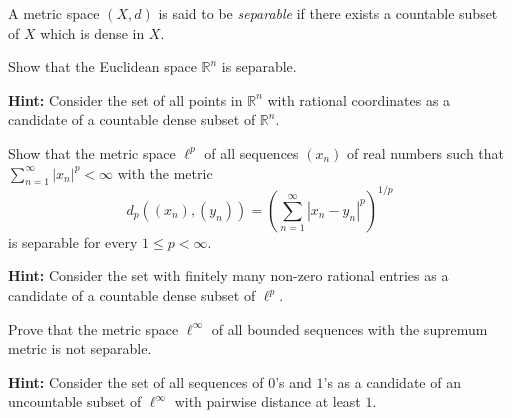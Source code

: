 \documentclass[12pt, a4paper]{article}
\begin{document}
\begin{definition}
A metric space $(X,d)$ is said to be \emph{separable} if there exists a countable subset of $X$
which is dense in $X$.
\end{definition}

\clearpage

\begin{problem}
Show that the Euclidean space $\mathbb{R}^n$ is separable.
\end{problem}
\textbf{Hint:} Consider the set of all points in $\mathbb{R}^n$ with rational coordinates as a candidate of a countable dense subset of $\mathbb{R}^n$.
\clearpage

\begin{problem}
Show that the metric space $\ell^p$ of all sequences $(x_n)$ of real numbers such that $\sum_{n=1}^\infty |x_n|^p<\infty$ with the metric
\[d_p((x_n),(y_n))=\left(\sum_{n=1}^\infty |x_n-y_n|^p\right)^{1/p}\]
is separable for every $1\leq p<\infty$.
\end{problem}
\textbf{Hint:} Consider the set with finitely many non-zero rational entries as a candidate of a countable dense subset of $\ell^p$.

\clearpage

\begin{problem}
Prove that the metric space $\ell^\infty$ of all bounded sequences with the supremum metric
is not separable.
\end{problem}
\textbf{Hint:} Consider the set of all sequences of $0$'s and $1$'s as a candidate of an uncountable subset of $\ell^\infty$ with pairwise distance at least $1$.


\clearpage

\EndPage
\end{document}
